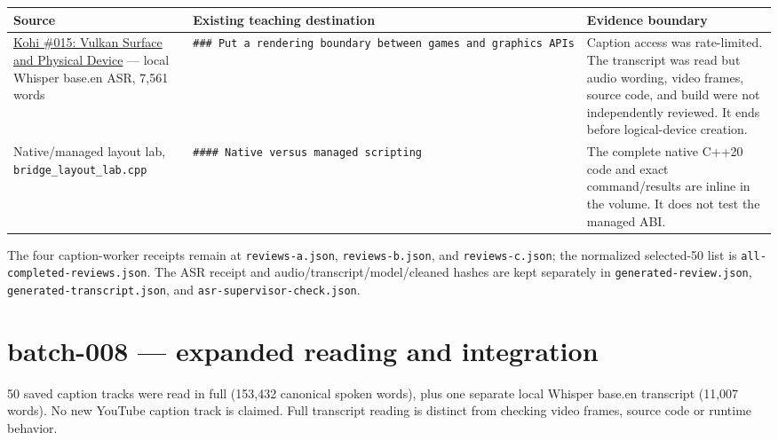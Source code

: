 {\def\LTcaptype{none} %
\begin{longtable}[]{@{}
  >{\raggedright\arraybackslash}p{}
  >{\raggedright\arraybackslash}p{}
  >{\raggedright\arraybackslash}p{}@{}}
\toprule\noalign{}
\begin{minipage}[b]{\linewidth}\raggedright
Source
\end{minipage} & \begin{minipage}[b]{\linewidth}\raggedright
Existing teaching destination
\end{minipage} & \begin{minipage}[b]{\linewidth}\raggedright
Evidence boundary
\end{minipage} \\
\midrule\noalign{}
\endhead
\bottomrule\noalign{}
\endlastfoot
\href{https://www.youtube.com/watch?v=6Kj3O2Ov1RU}{Kohi \#015: Vulkan Surface and Physical Device} --- local Whisper base.en ASR, 7,561 words & \texttt{\#\#\#\ Put\ a\ rendering\ boundary\ between\ games\ and\ graphics\ APIs} & Caption access was rate-limited. The transcript was read but audio wording, video frames, source code, and build were not independently reviewed. It ends before logical-device creation. \\
Native/managed layout lab, \texttt{bridge\_layout\_lab.cpp} & \texttt{\#\#\#\#\ Native\ versus\ managed\ scripting} & The complete native C++20 code and exact command/results are inline in the volume. It does not test the managed ABI. \\
\end{longtable}
}

The four caption-worker receipts remain at \texttt{reviews-a.json}, \texttt{reviews-b.json}, and \texttt{reviews-c.json}; the normalized selected-50 list is \texttt{all-completed-reviews.json}. The ASR receipt and audio/transcript/model/cleaned hashes are kept separately in \texttt{generated-review.json}, \texttt{generated-transcript.json}, and \texttt{asr-supervisor-check.json}.

\section{batch-008 --- expanded reading and integration}\label{appendix-877738f6f4d2-batch-008-expanded-reading-and-integration}

50 saved caption tracks were read in full (153,432 canonical spoken words), plus one separate local Whisper base.en transcript (11,007 words). No new YouTube caption track is claimed. Full transcript reading is distinct from checking video frames, source code or runtime behavior.


